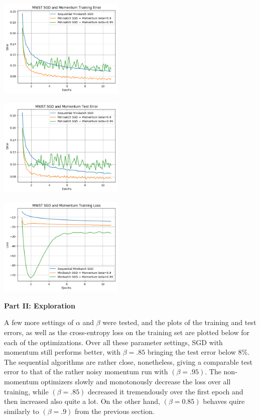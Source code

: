 \documentclass[10pt]{article}
\begin{document}
\begin{multicols}{2}
\begin{center}
\end{center}
\begin{center}
    \includegraphics[width=0.45\textwidth]{SGDandMomentumTrainingError.png}
\end{center}
\begin{center}
    \includegraphics[width=0.45\textwidth]{SGDandMomentumTestError.png}
\end{center}
\begin{center}
    \includegraphics[width=0.45\textwidth]{SGDandMomentumTrainingLoss.png}
\end{center}
\noindent
\textbf{Part II: Exploration} \par
A few more settings of $\alpha$ and $\beta$ were tested, and the plots of the training and test errors, as well as the cross-entropy loss on the training set are plotted below for each of the optimizations. Over all these parameter settings, SGD with momentum still performs better, with $\beta=.85$ bringing the test error below 8\%. The sequential algorithms are rather close, nonetheless, giving a comparable test error to that of the rather noisy momentum run with $(\beta=.95)$. The non-momentum optimizers slowly and monotonously decrease the loss over all training, while $(\beta=.85)$ decreased it tremendously over the first epoch and then increased also quite a lot. On the other hand, $(\beta=0.85)$ behaves quire similarly to $(\beta=.9)$ from the previous section.

\end{multicols}
\end{document}
